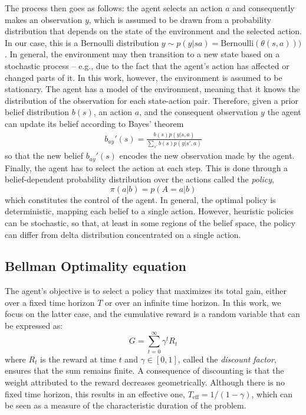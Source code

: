 \documentclass[aps,nofootinbib,groupaddress,superscriptaddress,reprint,amsmath,amssymb,graphicx,onecolumn,prx]{revtex4-2}
\begin{document}
The process then goes as follows: the agent selects an action $a$ and consequently makes an observation $y$, which is assumed to be drawn from a probability distribution that depends on the state of the environment and the selected action. In our case, this is a Bernoulli distribution $y\sim p(y|sa)=\text{Bernoulli}(\theta(s,a)))$. In general, the environment may then transition to a new state based on a stochastic process -- e.g., due to the fact that the agent's action has affected or changed parts of it. In this work, however, the environment is assumed to be stationary. The agent has a model of the environment, meaning that it knows the distribution of the observation for each state-action pair. Therefore, given a prior belief distribution $b(s)$, an action $a$, and the consequent observation $y$ the agent can update its belief according to Bayes' theorem
\begin{align}
    b_{ay}'(s)=\frac{b(s)p(y|s,a)}{\sum_{s'}b(s)p(y|s',a)}
    \label{eq:belief_update}
\end{align}
so that the new belief $b_{ay}'(s)$ encodes the new observation made by the agent. Finally, the agent has to select the action at each step. This is done through a belief-dependent probability distribution over the actions called the \textit{policy}, 
\begin{equation}
    \pi(a|b)=p(A=a|b)
\end{equation}
which constitutes the control of the agent. In general, the optimal policy is deterministic, mapping each belief to a single action. However, heuristic policies can be stochastic, so that, at least in some regions of the belief space, the policy can differ from delta distribution concentrated on a single action.
\subsection{Bellman Optimality equation}
\noindent The agent's objective is to select a policy that maximizes its total gain, either over a fixed time horizon $T$ or over an infinite time horizon. In this work, we focus on the latter case, and the cumulative reward is a random variable that can be expressed as:
\begin{equation}
    G = \sum_{t=0}^\infty \gamma^t R_t
\end{equation}
where $R_t$ is the reward at time $t$ and $\gamma\in\left[0,1\right]$, called the \textit{discount factor}, ensures that the sum remains finite. A consequence of discounting is that the weight attributed to the reward decreases geometrically. Although there is no fixed time horizon, this results in an effective one, $T_\mathrm{eff}=1/(1-\gamma)$, which can be seen as a measure of the characteristic duration of the problem.
\end{document}
